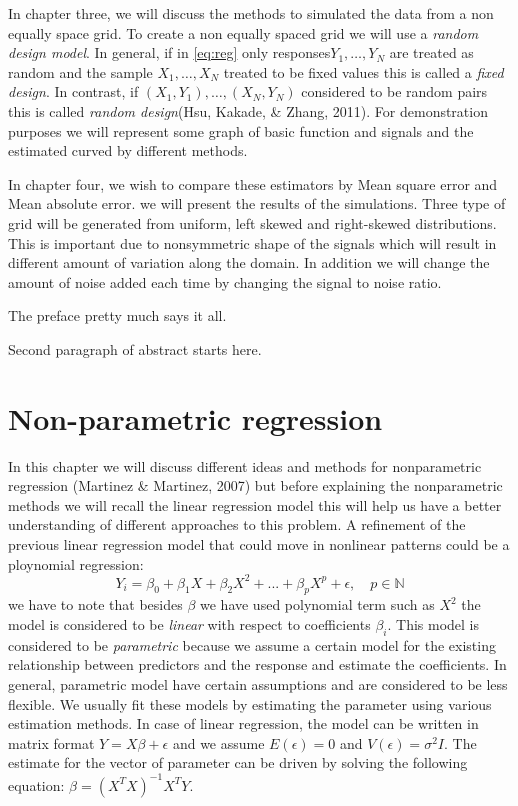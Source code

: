 \documentclass[12pt,twoside, a4paper]{reedthesis}
\begin{document}
In chapter three, we will discuss the methods to simulated the data from a non equally space grid. To create a non equally spaced grid we will use a \emph{random design model}. In general, if in \eqref{eq:reg} only responses\(Y_1,\dots,Y_N\) are treated as random and the sample \(X_1,\dots,X_N\) treated to be fixed values this is called a \emph{fixed design}. In contrast, if \((X_1,Y_1),\dots,(X_N,Y_N)\) considered to be random pairs this is called \emph{random design}(Hsu, Kakade, \& Zhang, 2011). For demonstration purposes we will represent some graph of basic function and signals and the estimated curved by different methods.

In chapter four, we wish to compare these estimators by Mean square error and Mean absolute error. we will present the results of the simulations. Three type of grid will be generated from uniform, left skewed and right-skewed distributions. This is important due to nonsymmetric shape of the signals which will result in different amount of variation along the domain. In addition we will change the amount of noise added each time by changing the signal to noise ratio.

The preface pretty much says it all.

\par

Second paragraph of abstract starts here.

\hypertarget{non-parametric-regression}{%
\chapter{Non-parametric regression}\label{non-parametric-regression}}

In this chapter we will discuss different ideas and methods for nonparametric regression (Martinez \& Martinez, 2007) but before explaining the nonparametric methods we will recall the linear regression model this will help us have a better understanding of different approaches to this problem. A refinement of the previous linear regression model that could move in nonlinear patterns could be a ploynomial regression:
\begin{equation}
Y_{i}=\beta_{0}+\beta_{1}X+\beta_{2}X^{2}+...+\beta_{p}X^{p}+\epsilon, \quad p \in\mathbb{N}
 \label{eq:classiceq}
\end{equation}
we have to note that besides \(\beta\) we have used polynomial term such as \(X^2\) the model is considered to be \emph{linear} with respect to coefficients \(\beta_{i}\). This model is considered to be \emph{parametric} because we assume a certain model for the existing relationship between predictors and the response and estimate the coefficients. In general, parametric model have certain assumptions and are considered to be less flexible. We usually fit these models by estimating the parameter using various estimation methods. In case of linear regression, the model can be written in matrix format \(Y=X\beta+\epsilon\) and we assume \(E(\epsilon)=0\) and \(V(\epsilon)=\sigma^{2}I\). The estimate for the vector of parameter can be driven by solving the following equation: \(\beta=(X^{T}X)^{-1}X^{T}Y\).
\end{document}
